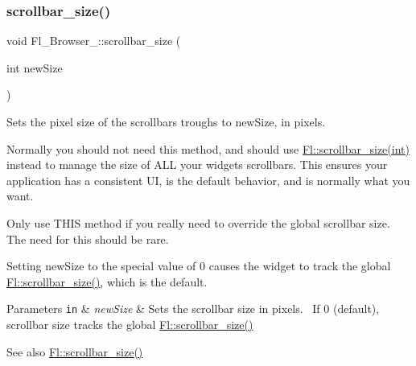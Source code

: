\subsubsection{\texorpdfstring{scrollbar\+\_\+size()}{scrollbar\_size()}\hspace{0.1cm}{\footnotesize\ttfamily [2/2]}}
{\footnotesize\ttfamily void Fl\+\_\+\+Browser\+\_\+\+::scrollbar\+\_\+size (\begin{DoxyParamCaption}\item[{int}]{new\+Size }\end{DoxyParamCaption})\hspace{0.3cm}{\ttfamily [inline]}}

Sets the pixel size of the scrollbars\textquotesingle{} troughs to {\ttfamily new\+Size}, in pixels.

Normally you should not need this method, and should use \hyperlink{class_fl_aca2f98b26f2552b82dd245b8094a41aa}{Fl\+::scrollbar\+\_\+size(int)} instead to manage the size of A\+LL your widgets\textquotesingle{} scrollbars. This ensures your application has a consistent UI, is the default behavior, and is normally what you want.

Only use T\+H\+IS method if you really need to override the global scrollbar size. The need for this should be rare.

Setting {\ttfamily new\+Size} to the special value of 0 causes the widget to track the global \hyperlink{class_fl_ae861b8bd4f2d4dcbec7be697e8b4b80e}{Fl\+::scrollbar\+\_\+size()}, which is the default.


\begin{DoxyParams}[1]{Parameters}
\mbox{\tt in}  & {\em new\+Size} & Sets the scrollbar size in pixels.~\newline
 If 0 (default), scrollbar size tracks the global \hyperlink{class_fl_ae861b8bd4f2d4dcbec7be697e8b4b80e}{Fl\+::scrollbar\+\_\+size()} \\
\hline
\end{DoxyParams}
\begin{DoxySeeAlso}{See also}
\hyperlink{class_fl_ae861b8bd4f2d4dcbec7be697e8b4b80e}{Fl\+::scrollbar\+\_\+size()} 
\end{DoxySeeAlso}
\mbox{\label{class_fl___browser___a397cd7d2550ca3d87032fa1ffd3e4bbc}} 

